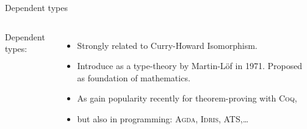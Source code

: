 \documentclass[xcolor=svgnames,11pt]{beamer}
\newcommand{\mysc}[1]{\textsc{#1}\xspace}
\newcommand{\coq}{\textsc{Coq}\xspace}
\newcommand{\agda}{\textsc{Agda}\xspace}
\begin{document}
\begin{frame}{Dependent types}
\begin{columns}
Dependent types:
\begin{itemize}
\item<2-> Strongly related to Curry-Howard Isomorphism.
\item<3-> Introduce as a type-theory by Martin-Löf in 1971. Proposed as foundation of mathematics.
\item<4-> As gain popularity recently for theorem-proving with \coq,
\item<5-> but also in programming: {\agda}, \mysc{Idris}, \mysc{ATS},\dots
\end{itemize}
\end{columns}
\end{frame}
\end{document}
